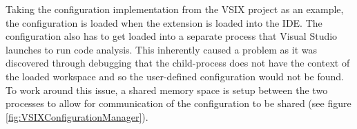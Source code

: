 
Taking the configuration implementation from the VSIX project as an example, the configuration is loaded when the extension is loaded into the IDE. The configuration also has to get loaded into a separate process that Visual Studio launches to run code analysis. This inherently caused a problem as it was discovered through debugging that the child-process does not have the context of the loaded workspace and so the user-defined configuration would not be found. To work around this issue, a shared memory space is setup between the two processes to allow for communication of the configuration to be shared (see figure \ref{fig:VSIXConfigurationManager}).
